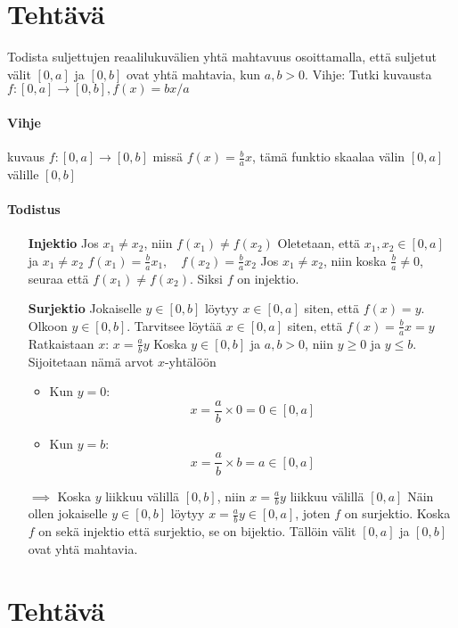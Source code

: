 \documentclass{article}
\newcounter{tehtava}
\begin{document}
\newpage
{}
\section*{Tehtävä \thetehtava}
Todista suljettujen reaalilukuvälien yhtä mahtavuus osoittamalla, että suljetut välit $[0, a]$ ja
$[0, b]$ ovat yhtä mahtavia, kun $a, b > 0$. Vihje: Tutki kuvausta $f : [0, a] \rightarrow [0, b], f(x) = bx/a$
\newline
\paragraph*{Vihje}
kuvaus $f : [0, a] \rightarrow [0, b]$ missä $f(x) = \frac{b}{a}x$, tämä funktio skaalaa välin $[0, a]$ välille $[0, b]$

\paragraph*{Todistus}
\begin{itemize}
    \item[\textbf{Injektio}] Jos $x_1 \neq x_2$, niin $f(x_1) \neq f(x_2)$\newline
    Oletetaan, että $x_1, x_2 \in [0, a]$ ja $x_1 \neq x_2$\newline
    $f(x_1) = \frac{b}{a}x_1, \quad f(x_2) = \frac{b}{a}x_2$\newline
    Jos $x_1 \neq x_2$, niin koska $\frac{b}{a} \neq 0$, seuraa että $f(x_1) \neq f(x_2)$. Siksi $f$ on injektio.
    \item[\textbf{Surjektio}] Jokaiselle $y \in [0, b]$ löytyy $x \in [0, a]$ siten, että $f(x) = y$.\newline
    Olkoon $y \in [0, b]$. Tarvitsee löytää $x \in [0, a]$ siten, että\newline
    $f(x) = \frac{b}{a}x = y$\newline
    \newline
    Ratkaistaan $x$:\newline
    $x = \frac{a}{b}y$\newline
    Koska $y \in [0, b]$ ja $a, b > 0$, niin $y \geq 0$ ja $y \leq b$. Sijoitetaan nämä arvot $x$-yhtälöön
    \begin{itemize}
        \item Kun $y = 0$:
        \[
        x = \frac{a}{b} \times 0 = 0 \in [0, a]
        \]
        \item Kun $y = b$:
        \[
        x = \frac{a}{b} \times b = a \in [0, a]
        \]
    \end{itemize}
    $\implies$ Koska $y$ liikkuu välillä $[0, b]$, niin $x = \frac{a}{b}y$ liikkuu välillä $[0, a]$\newline
    Näin ollen jokaiselle  $y \in [0, b]$ löytyy $x = \frac{a}{b}y \in [0, a]$, joten $f$ on surjektio.\newline
    \newline
    Koska $f$ on sekä injektio että surjektio, se on bijektio. Tällöin välit $[0, a]$ ja $[0, b]$ ovat yhtä mahtavia.
\end{itemize}


\newpage
{}
\section*{Tehtävä \thetehtava}
\end{document}
